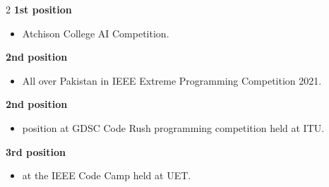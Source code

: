 \documentclass[10pt,a4paper,ragged2e,withhyper]{altacv}
\begin{document}
\begin{paracol}{2}
    \textbf{1st position}
        \begin{itemize}
            \item Atchison College AI Competition.
        \end{itemize}
        
    \textbf{2nd position}
        \begin{itemize}
            \item All over Pakistan in IEEE Extreme Programming Competition
2021.
        \end{itemize}

    \textbf{2nd position}
        \begin{itemize}
            \item position at GDSC Code Rush programming competition held at
ITU.
        \end{itemize}
    \textbf{3rd position}
        \begin{itemize}
            \item at the IEEE Code Camp held at UET.
        \end{itemize}
\end{paracol}
\end{document}
